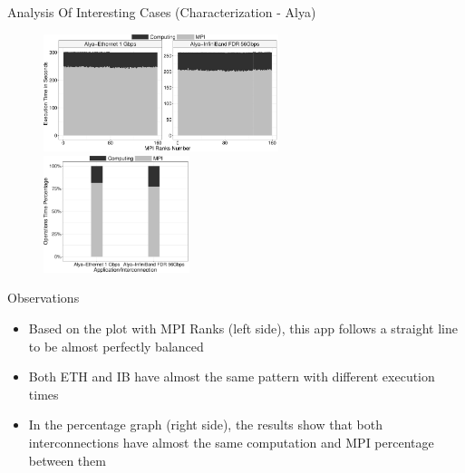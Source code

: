 \documentclass{beamer}
\begin{document}
\begin{frame}{Analysis Of Interesting Cases (Characterization - Alya)}
\begin{figure}
   \includegraphics[width=0.61\textwidth]{SLIDES/img/Alya.charac.pdf}
   \includegraphics[width=0.38\textwidth]{SLIDES/img/Alya.percentage.pdf}
\end{figure}
Observations
\begin{itemize}
    \pause\item Based on the plot with MPI Ranks (left side), this app follows a straight line to be almost perfectly balanced
    \pause\item Both ETH and IB have almost the same pattern with different execution times
    \pause\item In the percentage graph (right side), the results show that both interconnections have almost the same computation and MPI percentage between them
\end{itemize}
\end{frame}
\end{document}
